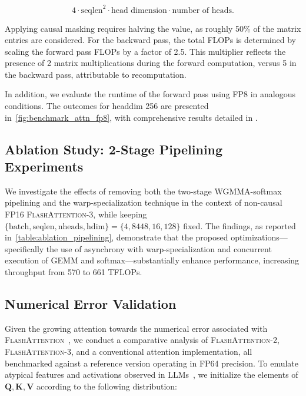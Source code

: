\begin{enumerate}
\begin{algorithm}[H]
\begin{algorithmic}[1]
\begin{enumerate}
\begin{itemize}
\begin{equation*}
  4 \cdot \text{seqlen}^2 \cdot \text{head dimension} \cdot \text{number of heads}.
\end{equation*}

Applying causal masking requires halving the value, as roughly 50\% of the matrix entries are considered. For the backward pass, the total FLOPs is determined by scaling the forward pass FLOPs by a factor of 2.5. This multiplier reflects the presence of 2 matrix multiplications during the forward computation, versus 5 in the backward pass, attributable to recomputation.

In addition, we evaluate the runtime of the forward pass using FP8 in analogous conditions. The outcomes for headdim 256 are presented in~\cref{fig:benchmark_attn_fp8}, with comprehensive results detailed in .

\subsection{Ablation Study: 2-Stage Pipelining Experiments}
\label{sec:2-stage-pipelining-experiments}

We investigate the effects of removing both the two-stage WGMMA-softmax pipelining and the warp-specialization technique in the context of non-causal FP16 \textsc{FlashAttention-3}, while keeping $\{\text{batch}, \text{seqlen}, \text{nheads}, \text{hdim}\} = \{ 4, 8448, 16, 128\}$ fixed. The findings, as reported in~\cref{table:ablation_pipelining}, demonstrate that the proposed optimizations—specifically the use of asynchrony with warp-specialization and concurrent execution of GEMM and softmax—substantially enhance performance, increasing throughput from 570 to 661 TFLOPs.

\subsection{Numerical Error Validation}
\label{sec:numerical_error}

Given the growing attention towards the numerical error associated with \textsc{FlashAttention}~\citep{golden2024flash}, we conduct a comparative analysis of \textsc{FlashAttention-2}, \textsc{FlashAttention-3}, and a conventional attention implementation, all benchmarked against a reference version operating in FP64 precision. To emulate atypical features and activations observed in LLMs~\citep{dettmers2208llm, sun2024massive}, we initialize the elements of $\mathbf{Q}, \mathbf{K}, \mathbf{V}$ according to the following distribution:


\end{itemize}
\end{enumerate}
\end{algorithmic}
\end{algorithm}
\end{enumerate}
